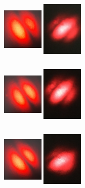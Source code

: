 \documentclass[12pt]{book}
\begin{document}
\begin{figure}[t!]
\begin{subfigure}[b]{0.3\linewidth}
\caption{}
\end{subfigure}
\begin{subfigure}[b]{0.3\linewidth}
\centering
\includegraphics[width=2cm,height=3cm]{images/fotos/31.jpg}
\includegraphics[width=2cm,height=3cm]{images/fotos/92.jpg}
\caption{}
\end{subfigure}
\begin{subfigure}[b]{0.3\linewidth}
\centering
\includegraphics[width=2cm,height=3cm]{images/fotos/41.jpg}
\includegraphics[width=2cm,height=3cm]{images/fotos/82.jpg}
\caption{}
\end{subfigure}
\begin{subfigure}[b]{0.3\linewidth}
\centering
\includegraphics[width=2cm,height=3cm]{images/fotos/51.jpg}
\includegraphics[width=2cm,height=3cm]{images/fotos/72.jpg}

\end{subfigure}
\end{figure}
\end{document}

